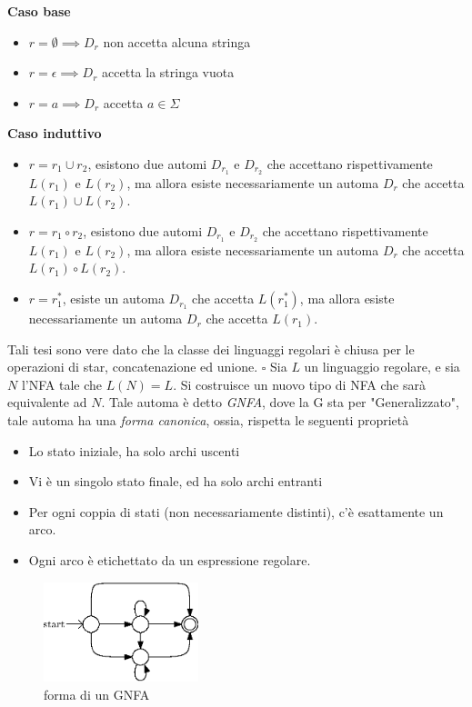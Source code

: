 \documentclass[10pt, letterpaper]{report}
\begin{document}
\textbf{Caso base }\begin{itemize}
    \item $r=\emptyset\implies D_r$ non accetta alcuna stringa 
    \item $r=\epsilon\implies D_r$  accetta la stringa vuota
    \item $r=a\implies D_r$  accetta  $a\in\Sigma$
\end{itemize}
\textbf{Caso induttivo}\begin{itemize}
    \item $r=r_1\cup r_2$, esistono due automi $D_{r_1}$ e  $D_{r_2}$ che accettano rispettivamente $L(r_1)$ 
    e $L(r_2)$, ma allora esiste necessariamente un automa $D_r$ che accetta $L(r_1)\cup L(r_2)$.
    \item $r=r_1\circ r_2$,  esistono due automi $D_{r_1}$ e  $D_{r_2}$ che accettano rispettivamente $L(r_1)$ 
    e $L(r_2)$, ma allora esiste necessariamente un automa $D_r$ che accetta $L(r_1)\circ L(r_2)$.
    \item $r=r_1^*$, esiste un automa $D_{r_1}$  che accetta
     $L(r_1^*)$, ma allora esiste necessariamente un automa $D_r$ che accetta $L(r_1)$.
\end{itemize}
Tali tesi sono vere dato che la classe dei linguaggi regolari è chiusa per le operazioni di star, concatenazione 
ed unione. $\square $\acc 
{} Sia $L$ un linguaggio regolare, e sia $N$ l'NFA tale che 
$L(N)=L$. Si costruisce un nuovo tipo di NFA che sarà equivalente ad $N$. Tale automa è detto \textit{GNFA}, 
dove la G sta per "Generalizzato", tale automa ha una \textit{forma canonica}, ossia, rispetta le seguenti 
proprietà \begin{itemize}
    \item Lo stato iniziale, ha solo archi uscenti 
    \item Vi è un singolo stato finale, ed ha solo archi entranti
    \item Per ogni coppia di stati (non necessariamente distinti), c'è esattamente un arco.
    \item Ogni arco è etichettato da un espressione regolare.
\end{itemize}
\begin{center}
    \begin{figure}[h!]
        \centering 
        \includegraphics[width=0.4\textwidth ]{images/GNFA.eps}
        \caption{forma di un GNFA}
        \label{fig:GNFA}
    \end{figure}
\end{center}
\end{document}
